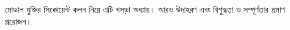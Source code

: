 \documentclass[../../../include/open-logic-chapter]{subfiles}
\begin{document}
\begin{editorial}
  মোডাল যুক্তির সিকোয়েন্ট কলন নিয়ে এটি
  খসড়া অধ্যায়। আরও উদাহরণ এবং বিশুদ্ধতা ও
  সম্পূর্ণতার প্রমাণ প্রয়োজন।
\end{editorial}


\OLEndChapterHook
\end{document}
